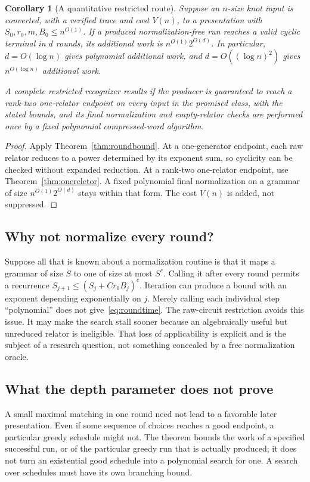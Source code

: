 \documentclass[11pt,letterpaper]{article}
\newtheorem{corollary}[theorem]{Corollary}
\theoremstyle{definition}
\begin{document}
\begin{corollary}[A quantitative restricted route]
\label{cor:quasi}
Suppose an $n$-size knot input is converted, with a verified trace and cost
$V(n)$, to a presentation with $S_0,r_0,m,B_0\leq n^{O(1)}$. If a produced
normalization-free run reaches a valid cyclic terminal in $d$ rounds, its
additional work is $n^{O(1)}2^{O(d)}$. In particular, $d=O(\log n)$ gives
polynomial additional work, and $d=O((\log n)^2)$ gives
$n^{O(\log n)}$ additional work.

A complete restricted recognizer results if the producer is guaranteed to
reach a rank-two one-relator endpoint on every input in the promised class,
with the stated bounds, and its final normalization and empty-relator checks
are performed once by a fixed polynomial compressed-word algorithm.
\end{corollary}
\begin{proof}
Apply Theorem~\ref{thm:roundbound}. At a one-generator endpoint, each raw
relator reduces to a power determined by its exponent sum, so cyclicity can
be checked without expanded reduction. At a rank-two one-relator endpoint,
use Theorem~\ref{thm:onereletor}. A fixed polynomial final normalization on a
grammar of size $n^{O(1)}2^{O(d)}$ stays within that form. The cost $V(n)$ is
added, not suppressed.
\end{proof}

\subsection{Why not normalize every round?}
Suppose all that is known about a normalization routine is that it maps a
grammar of size $S$ to one of size at most $S^c$. Calling it after every round
permits a recurrence $S_{j+1}\leq(S_j+C r_0B_j)^c$. Iteration can produce a
bound with an exponent depending exponentially on $j$. Merely calling each
individual step ``polynomial'' does not give~\eqref{eq:roundtime}.
The raw-circuit restriction avoids this issue. It may make the search stall
sooner because an algebraically useful but unreduced relator is ineligible.
That loss of applicability is explicit and is the subject of a research
question, not something concealed by a free normalization oracle.

\subsection{What the depth parameter does not prove}
A small maximal matching in one round need not lead to a favorable later
presentation. Even if some sequence of choices reaches a good endpoint,
a particular greedy schedule might not. The theorem bounds the work of a
specified successful run, or of the particular greedy run that is actually
produced; it does not turn an existential good schedule into a polynomial
search for one. A search over schedules must have its own branching bound.
\end{document}
